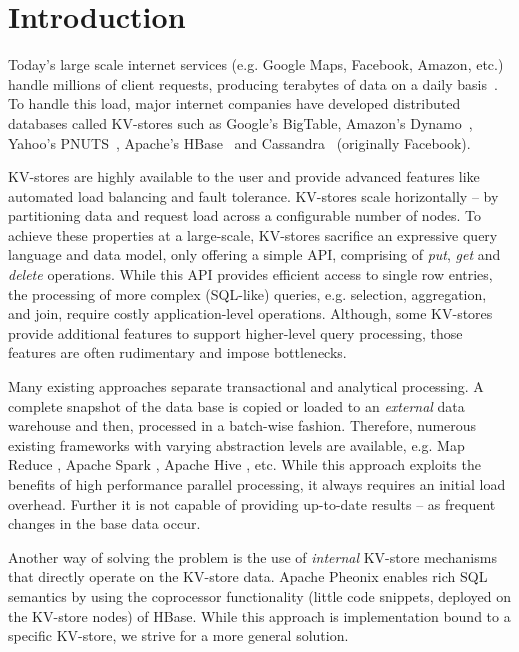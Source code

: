 \section{Introduction}
\label{sec:introduction}

Today's large scale internet services (e.g. Google Maps, Facebook, 
Amazon, etc.) handle millions of client requests, producing 
terabytes of data on a daily basis~\cite{parikh:facebook}. To handle 
this load, major internet companies have developed distributed 
databases called KV-stores such as Google's BigTable\cite{chang:bigtable},
Amazon's Dynamo~\cite{decandia:dynamo}, Yahoo's
PNUTS~\cite{cooper:pnuts}, Apache's HBase~\cite{george:hbase} and
Cassandra~\cite{hewitt:cassandra} (originally Facebook).

KV-stores are highly available to the user and provide advanced 
features like automated load balancing and fault tolerance. KV-stores 
scale horizontally -- by partitioning data and request load across a 
configurable number of nodes. To achieve these properties at a large-scale, 
KV-stores sacrifice an expressive query language and data model, only 
offering a simple API, comprising of \textit{put}, \textit{get} and 
\textit{delete} operations. While this API provides efficient access 
to single row entries, the processing of more complex (SQL-like) queries, e.g. 
selection, aggregation, and join, require costly application-level 
operations. Although, some KV-stores provide additional features to 
support higher-level query processing, those features are often 
rudimentary and impose bottlenecks. 

 Many existing approaches separate transactional and analytical 
processing. A complete snapshot of the data base is copied or loaded to 
an \textit{external} data warehouse and then, processed in a batch-wise 
fashion. Therefore, numerous existing frameworks with varying 
abstraction levels are available, e.g. Map Reduce \cite{dean:mapreduce}, 
Apache Spark \cite{zaharia:spark}, Apache Hive \cite{thusoo:hive}, etc. 
While this approach exploits the benefits of high performance parallel 
processing, it always requires an initial load overhead. Further it is 
not capable of providing up-to-date results -- as frequent changes in 
the base data occur. 

Another way of solving the problem is the use of \textit{internal} 
KV-store mechanisms that directly operate on the KV-store data. Apache 
Pheonix \cite{phoenix:apache} enables rich SQL 
semantics by using the coprocessor functionality (little code snippets, 
deployed on the KV-store nodes) of HBase. While this approach is 
implementation bound to a specific KV-store, we strive for a more general 
solution. 
 

